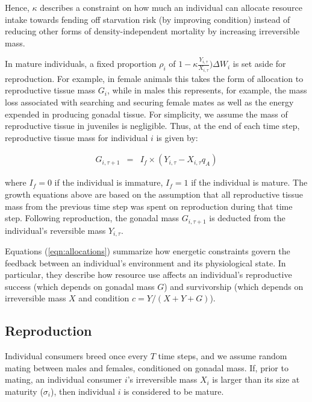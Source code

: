 \documentclass[11pt]{article}
\begin{document}
\begin{linenumbers}
Hence, $\kappa$ describes a constraint on how much an individual can allocate resource intake towards fending off starvation risk (by improving condition) instead of reducing other forms of density-independent mortality by increasing irreversible mass.

In mature individuals, a fixed proportion $\rho_i$ of $1-\kappa \frac{Y_{i,\tau}}{X_{i,\tau}}) \Delta W_i$ is set aside for reproduction. For example, in female animals this takes the form of allocation to reproductive tissue mass $G_i$, while in males this represents, for example, the mass loss associated with searching and securing female mates as well as the energy expended in producing gonadal tissue. For simplicity, we assume the mass of reproductive tissue in juveniles is negligible. Thus, at the end of each time step, reproductive tissue mass for individual $i$ is given by:
\begin{linenomath}
\begin{eqnarray}
\label{eqn:allocations}
G_{i,\tau+1} &=& I_f \times (Y_{i,\tau} - X_{i,\tau} q_A)
\end{eqnarray}
\end{linenomath}
where $I_f = 0$ if the individual is immature, $I_f = 1$ if the individual is mature. The growth equations above are based on the assumption that all reproductive tissue mass from the previous time step was spent on reproduction during that time step. Following reproduction, the gonadal mass $G_{i,\tau+1}$ is deducted from the individual's reversible mass $Y_{i,\tau}$.

Equations (\ref{eqn:allocations}) summarize how energetic constraints govern the feedback between an individual's environment and its physiological state. In particular, they describe how resource use affects an individual's reproductive success (which depends on gonadal mass $G$) and survivorship (which depends on irreversible mass $X$ and condition $c=Y/(X+Y+G)$).

\subsection*{Reproduction}
Individual consumers breed once every $T$ time steps, and we assume random mating between males and females, conditioned on gonadal mass. If, prior to mating, an individual consumer $i$'s irreversible mass $X_i$ is larger than its size at maturity ($\sigma_i$), then individual $i$ is considered to be mature. 


\end{linenumbers}
\end{document}
